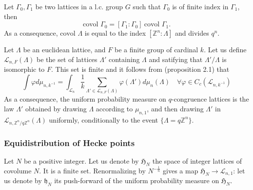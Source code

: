 \documentclass{article}
\begin{document}
\subsubsection{}
Let $\Gamma_0 , \Gamma_1$ be two lattices in a l.c. group $G$ such that $\Gamma_0$ is of finite index in $\Gamma_1$, then 
\[ \text{covol } \Gamma_0  = [\Gamma_1 : \Gamma_0 ] \ \text{covol } \Gamma_1 .\]
As a consequence, $\text{covol }\Lambda $ is equal to the index $[\mathbb Z^n : \Lambda]$ and divides $q^n$.

Let $\Lambda$ be an euclidean lattice, and $F$ be a finite group of cardinal $k$. Let us define $\mathcal L_{n , F}(\Lambda ) $ be the set of lattices $\Lambda'$ containing $\Lambda$ and satifying that $\Lambda' / \Lambda $ is isomorphic to $F$. This set is finite and it follows from \cite{ordentlich2022new} (proposition 2.1) that
\[\int \varphi d\mu_{n,k^{-1}} = \int_{\mathcal L_n} \frac{1}{k}\sum_{\Lambda'\in \mathcal L_{n , F}(\Lambda )} \varphi(\Lambda') d\mu_{n}(\Lambda)  \quad \forall \varphi \in C_c(\mathcal L_{n,k^{-1}} ) \]
As a consequence, the uniform probability measure on $q$-congruence lattices is the law $\Lambda'$ obtained by drawing $\Lambda$ according to $\mu_{n,1}$, and then drawing $\Lambda'$ in $\mathcal L_{n,\mathbb Z^n /q\mathbb Z^n}(\Lambda)$ uniformly, conditionally to the event $\{\Lambda = q\mathbb Z^n\}$.

\subsubsection{Equidistribution of Hecke points}
Let $N$ be a positive integer. Let us denote by $\mathfrak H_N$ the space of integer lattices of covolume $N$. It is a finite set. Renormalizing by $N^{-\frac{1}{n}}$ gives a map $\mathfrak H_N \rightarrow \mathcal L_{n,1}$: let us denote by $\mathfrak h_{N}$ its push-forward of the uniform probability measure on $\mathfrak H_N$. 
\end{document}
